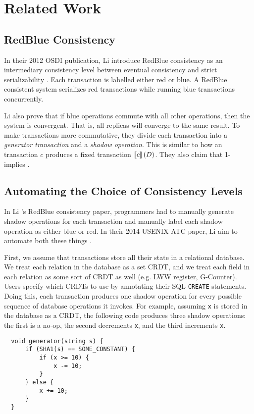 \section{Related Work}\label{sec:related}

\subsection{RedBlue Consistency}
In their 2012 OSDI publication, Li \etal{} introduce RedBlue consistency as an
intermediary consistency level between eventual consistency and strict
serializability \cite{li2012making}. Each transaction is labelled either red or
blue. A RedBlue consistent system serializes red transactions while running
blue transactions concurrently.

Li \etal{} also prove that if blue operations commute with all other
operations, then the system is convergent. That is, all replicas will converge
to the same result. To make transactions more commutative, they divide each
transaction into a \emph{generator transaction} and a \emph{shadow operation}.
This is similar to how an \imp{} transaction $c$ produces a fixed transaction
$\left\llbracket c\right\rrbracket(D)$. They also claim that 1-\isafety{} implies \iconfluence{}.

\subsection{Automating the Choice of Consistency Levels}
In Li \etal{}'s RedBlue consistency paper, programmers had to manually generate
shadow operations for each transaction and manually label each shadow operation
as either blue or red. In their 2014 USENIX ATC paper, Li \etal{} aim to
automate both these things \cite{li2014automating}.

First, we assume that transactions store all their state in a relational
database. We treat each relation in the database as a set CRDT, and we treat
each field in each relation as some sort of CRDT as well (e.g. LWW register,
G-Counter). Users specify which CRDTs to use by annotating their SQL
\texttt{CREATE} statements. Doing this, each transaction produces one shadow
operation for every possible sequence of database operations it invokes. For
example, assuming \texttt{x} is stored in the database as a CRDT, the following
code produces three shadow operations:
  the first is a no-op,
  the second decrements \texttt{x}, and
  the third increments \texttt{x}.
\begin{Verbatim}
  void generator(string s) {
      if (SHA1(s) == SOME_CONSTANT) {
          if (x >= 10) {
              x -= 10;
          }
      } else {
          x += 10;
      }
  }
\end{Verbatim}

